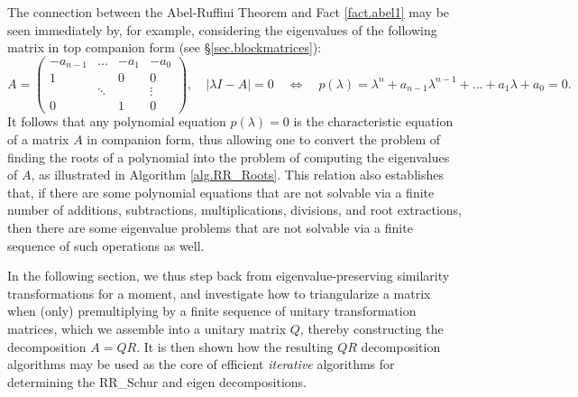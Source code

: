 The connection between the Abel-Ruffini Theorem and Fact \ref{fact.abel1} may be seen immediately by, for example, considering the
eigenvalues of the following matrix in top companion form (see \S \ref{sec.blockmatrices}):
\begin{equation*}
   A=\begin{pmatrix} -a_{n-1} &\ldots &  -a_{1} &  -a_0 \\
                     1        &       & 0         & 0 \\ 
                              &\ddots &           & \vdots \\ 
                     0        &       & 1         & 0 \end{pmatrix}, \quad
  |\lambda I - A|=0 \quad \Leftrightarrow \quad p(\lambda) = \lambda^n + a_{n-1} \lambda^{n-1} + \ldots + a_1 \lambda + a_0 = 0.
\end{equation*}
It follows that any polynomial equation $p(\lambda) = 0$ is the characteristic equation of a matrix $A$ in companion form,
thus allowing one to convert the problem of finding the roots of a polynomial into the problem of computing the eigenvalues of $A$,
as illustrated in Algorithm \ref{alg.RR_Roots}.
This relation also establishes that, if there are some polynomial equations that are not solvable
via a finite number of additions, subtractions, multiplications, divisions, and root extractions,
then there are some eigenvalue problems that are not solvable via a finite sequence of such operations as well.

\begin{figure*}[t]
\end{figure*}

In the following section, we thus step back from eigenvalue-preserving similarity transformations for a moment,
and investigate how to triangularize a matrix when (only) premultiplying by a finite sequence of unitary transformation matrices,
which we assemble into a unitary matrix $Q$, thereby constructing the decomposition $A=QR$.  It is then shown how the
resulting $QR$ decomposition algorithms may be used as the core of efficient {\it iterative} algorithms for determining
the RR_Schur and eigen decompositions.

